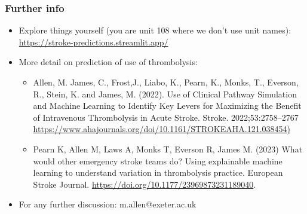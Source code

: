 \begin{frame}
\frametitle{Further info}

\begin{itemize}
    \setlength{\itemsep}{5mm}

    \item Explore things yourself (you are unit 108 where we don't use unit names): \url{https://stroke-predictions.streamlit.app/}

    \item More detail on prediction of use of thrombolysis:

        \begin{itemize}            

            \footnotesize
            \vspace{3mm}

            \setlength{\itemsep}{3mm}

            \item Allen, M. James, C., Frost,J., Liabo, K., Pearn, K., Monks, T., Everson, R., Stein, K. and James, M. (2022). Use of Clinical Pathway Simulation and Machine Learning to Identify Key Levers for Maximizing the Benefit of Intravenous Thrombolysis in Acute Stroke.  Stroke. 2022;53:2758–2767 \url{https://www.ahajournals.org/doi/10.1161/STROKEAHA.121.038454)}
        
            \item Pearn K, Allen M, Laws A, Monks T, Everson R, James M. (2023) What would other emergency stroke teams do? Using explainable machine learning to understand variation in thrombolysis practice. European Stroke Journal.  \url{https://doi.org/10.1177/23969873231189040}.
        \end{itemize}

    \item For any further discussion: m.allen@exeter.ac.uk
    
\end{itemize}


\end{frame}